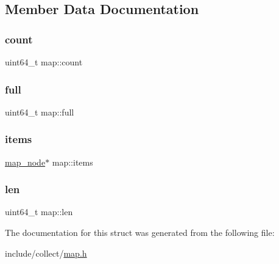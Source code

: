 \subsection{Member Data Documentation}
\mbox{\label{structmap_a5b34954e76b42c69e8dcc257579ef504}} 
\subsubsection{\texorpdfstring{count}{count}}
{\footnotesize\ttfamily uint64\+\_\+t map\+::count}

\mbox{\label{structmap_ac907ec19ab9a47454f8192671935f22b}} 
\subsubsection{\texorpdfstring{full}{full}}
{\footnotesize\ttfamily uint64\+\_\+t map\+::full}

\mbox{\label{structmap_a6b38d0a3f8cdff696c5907a53e9f2e42}} 
\subsubsection{\texorpdfstring{items}{items}}
{\footnotesize\ttfamily \hyperlink{structmap__node}{map\+\_\+node}$\ast$ map\+::items}

\mbox{\label{structmap_a5598721b26d57cba0a9d1fb346b62101}} 
\subsubsection{\texorpdfstring{len}{len}}
{\footnotesize\ttfamily uint64\+\_\+t map\+::len}



The documentation for this struct was generated from the following file\+:\begin{DoxyCompactItemize}
\item 
include/collect/\hyperlink{map_8h}{map.\+h}\end{DoxyCompactItemize}

